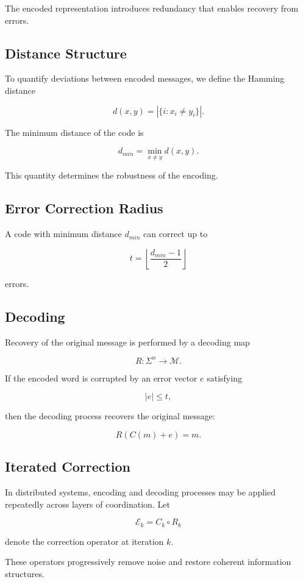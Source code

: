 \documentclass[12pt]{article}
\begin{document}
The encoded representation introduces redundancy that enables recovery from errors.

\subsection{Distance Structure}

To quantify deviations between encoded messages, we define the Hamming distance

\[
d(x,y) = |\{i : x_i \neq y_i\}|.
\]

The minimum distance of the code is

\[
d_{min} = \min_{x \neq y} d(x,y).
\]

This quantity determines the robustness of the encoding.

\subsection{Error Correction Radius}

A code with minimum distance $d_{min}$ can correct up to

\[
t = \left\lfloor \frac{d_{min}-1}{2} \right\rfloor
\]

errors.

\subsection{Decoding}

Recovery of the original message is performed by a decoding map

\[
R : \Sigma^n \rightarrow \mathcal{M}.
\]

If the encoded word is corrupted by an error vector $e$ satisfying

\[
|e| \le t,
\]

then the decoding process recovers the original message:

\[
R(C(m)+e) = m.
\]

\subsection{Iterated Correction}

In distributed systems, encoding and decoding processes may be applied repeatedly across layers of coordination. Let

\[
\mathcal{E}_k = C_k \circ R_k
\]

denote the correction operator at iteration $k$.

These operators progressively remove noise and restore coherent information structures.
\end{document}
